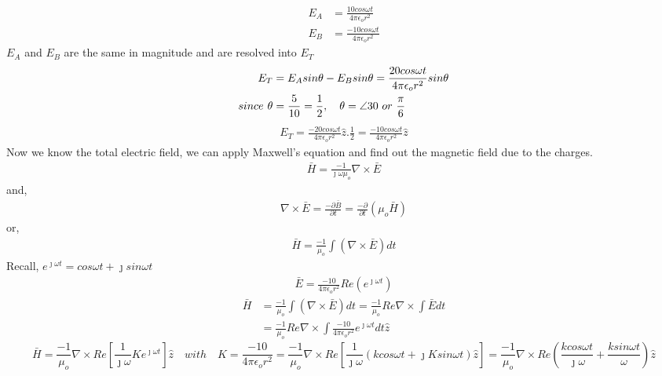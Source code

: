 \begin{exmp}
\begin{align*}
E_A &= \frac{10cos\omega t}{4\pi\epsilon_or^2}\\
E_B &= \frac{-10cos\omega t}{4\pi\epsilon_o r^2}
\end{align*}
$E_A$ and $E_B$ are the same in magnitude and are resolved into $E_T$
\begin{align*}
E_T &= E_Asin\theta - E_Bsin\theta = \frac{20cos\omega t}{4\pi\epsilon_o r^2}sin\theta \\
since \hspace{0.05in} \theta &= \frac{5}{10} = \frac{1}{2}, \quad \theta = \angle {30} \ or \ \frac{\pi}{6}
\end{align*}
\begin{align*}
E_T = \frac{-20cos\omega t}{4\pi\epsilon_o r^2}\hat{z}.\frac{1}{2} = \frac{-10cos\omega t}{4\pi\epsilon_o r^2}\hat{z}
\end{align*}
Now we know the total electric field, we can apply Maxwell's equation and find out the magnetic field due to the charges.
\begin{align*}
\bar{H} = \frac{-1}{\jmath\omega\mu_o}\nabla\times\bar{E}
\end{align*}
and,
\begin{align*}
\nabla\times\bar{E} = \frac{-\partial\bar{B}}{\partial t} = \frac{-\partial}{\partial t}(\mu_o\bar{H})
\end{align*}
or,
\begin{align*}
\bar{H} = \frac{-1}{\mu_o}\int(\nabla\times\bar{E})dt
\end{align*}
Recall, $ e^{\jmath\omega t} = cos\omega t + \jmath sin\omega t $
\begin{align*}
\bar{E} = \frac{-10}{4\pi\epsilon_o r^2}Re(e^{\jmath\omega t})
\end{align*}
\begin{align*}
\bar{H} &= \frac{-1}{\mu_o}\int(\nabla\times\bar{E})dt = \frac{-1}{\mu_o}Re\nabla\times\int\bar{E}dt\\
&= \frac{-1}{\mu_o}Re\nabla\times\int\frac{-10}{4\pi\epsilon_o r^2}e^{\jmath\omega t}dt\hat{z}
\end{align*}
\begin{dmath*}
\bar{H} = \frac{-1}{\mu_o}\nabla\times Re\left[\frac{1}{\jmath\omega}Ke^{\jmath\omega t} \right]\hat{z}\quad with\quad K =\frac{-10}{4\pi\epsilon_o r^2}
=\frac{-1}{\mu_o}\nabla\times Re\left[\frac{1}{\jmath\omega}(kcos\omega t + \jmath Ksin\omega t)\hat{z} \right]
= \frac{-1}{\mu_o}\nabla\times Re\left(\frac{kcos\omega t}{\jmath\omega} + \frac{ksin\omega t}{\omega} \right)\hat{z}

\end{dmath*}
\end{exmp}
